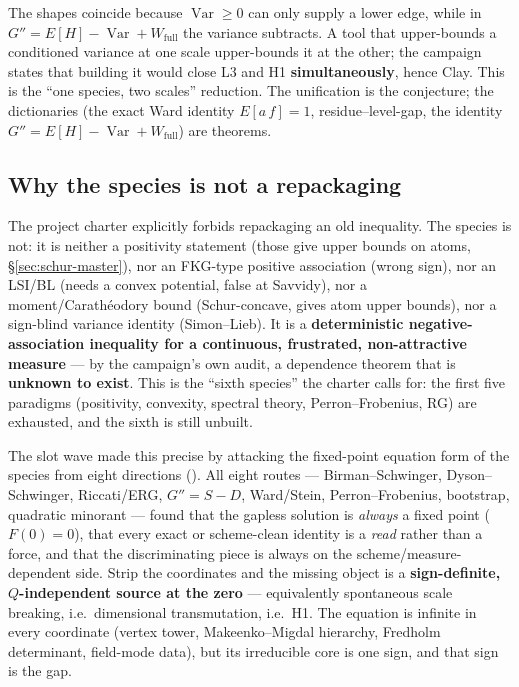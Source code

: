 The shapes coincide because $\operatorname{Var}\ge0$ can only supply a lower edge, while in
$G''=E[H]-\operatorname{Var}+W_{\mathrm{full}}$ the variance subtracts. A tool that upper-bounds
a conditioned variance at one scale upper-bounds it at the other; the campaign states that
building it would close L3 and H1 \textbf{simultaneously}, hence Clay. This is the ``one species,
two scales'' reduction. The unification is the conjecture; the dictionaries (the exact Ward
identity $E[a\,f]=1$, residue--level-gap, the identity
$G''=E[H]-\operatorname{Var}+W_{\mathrm{full}}$) are theorems.

\subsection{Why the species is not a repackaging}

The project charter explicitly forbids repackaging an old inequality. The species is not: it is
neither a positivity statement (those give upper bounds on atoms, \S\ref{sec:schur-master}), nor
an FKG-type positive association (wrong sign), nor an LSI/BL (needs a convex potential, false at
Savvidy), nor a moment/Carath\'eodory bound (Schur-concave, gives atom upper bounds), nor a
sign-blind variance identity (Simon--Lieb). It is a \textbf{deterministic negative-association
inequality for a continuous, frustrated, non-attractive measure} --- by the campaign's own audit,
a dependence theorem that is \textbf{unknown to exist}. This is the ``sixth species'' the charter
calls for: the first five paradigms (positivity, convexity, spectral theory, Perron--Frobenius,
RG) are exhausted, and the sixth is still unbuilt.

The slot wave made this precise by attacking the fixed-point equation form of the species from
eight directions (). All eight routes --- Birman--Schwinger,
Dyson--Schwinger, Riccati/ERG, $G''=S-D$, Ward/Stein, Perron--Frobenius, bootstrap, quadratic
minorant --- found that the gapless solution is \emph{always} a fixed point ($F(0)=0$), that every
exact or scheme-clean identity is a \emph{read} rather than a force, and that the discriminating
piece is always on the scheme/measure-dependent side. Strip the coordinates and the missing
object is a \textbf{sign-definite, $Q$-independent source at the zero} --- equivalently
spontaneous scale breaking, i.e.\ dimensional transmutation, i.e.\ H1. The equation is infinite
in every coordinate (vertex tower, Makeenko--Migdal hierarchy, Fredholm determinant, field-mode
data), but its irreducible core is one sign, and that sign is the gap.

